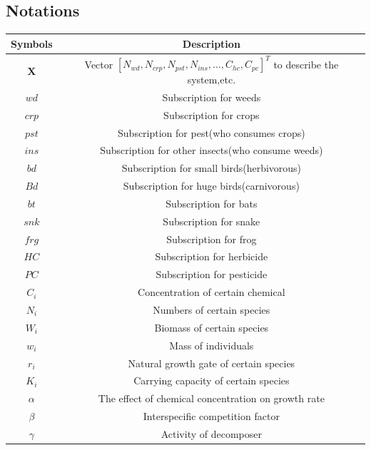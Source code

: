 \documentclass{HZNUMCM}
\begin{document}
        \subsection{Notations}
      \begin{table}[H]
        \centering
        \begin{tabular}{cc}
          \toprule
          \rowcolor{customcolor!40} %
          Symbols & Description\\
          \midrule
          $\mathbf{X}$ & Vector $[N_{wd},N_{crp},N_{pst},N_{ins},...,C_{hc},C_{pc}]^T$ to describe the system,etc. \\
          $wd$ & Subscription for weeds \\
          $crp$ & Subscription for crops \\
          $pst$ & Subscription for pest(who consumes crops) \\
          $ins$ & Subscription for other insects(who consume weeds) \\
          $bd$ & Subscription for small birds(herbivorous) \\
          $Bd$ & Subscription for huge birds(carnivorous) \\
          $bt$ & Subscription for bats \\
          $snk$ & Subscription for snake \\
          $frg$ & Subscription for frog \\
          $HC$ & Subscription for herbicide \\
          $PC$ & Subscription for pesticide \\
          $C_i$ & Concentration of certain chemical \\
          $N_i$ & Numbers of certain species \\
          $W_i$ & Biomass of certain species \\
          $w_i$ & Mass of individuals \\
          $r_i$ & Natural growth gate of certain species\\
          $K_i$ & Carrying capacity of certain species\\
          $\alpha$ & The effect of chemical concentration on growth rate\\
          $\beta$ & Interspecific competition factor\\
          $\gamma$ & Activity of decomposer\\
          
          \bottomrule
        \end{tabular}
        \label{tab:example}
      \end{table}
\end{document}
